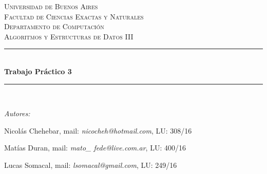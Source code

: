 \documentclass[A4paper,oneside,fleqn,11pt]{article}
\theoremstyle{definition}
\begin{document}

\begin{titlepage}

\center %

\newcommand{\HRule}{\rule{\linewidth}{0.5mm}} %

\textsc{\LARGE Universidad de Buenos Aires}\\[1.5cm] %
\textsc{\Large Facultad de Ciencias Exactas y Naturales}\\[0.5cm] %
\textsc{\large Departamento de Computación}\\[0.5cm] %
\textsc{\large Algoritmos y Estructuras de Datos III}\\[0.5cm] %

\HRule \\[0.8cm]
{ \huge \bfseries Trabajo Práctico 3}\\[0.4cm] %
\HRule \\[1.5cm]

\begin{minipage}{0.8\textwidth}
\center
\Large
\emph{Autores:}


{Nicolás Chehebar, mail: \textit{nicocheh@hotmail.com}, LU: 308/16 

Matías Duran, mail: \textit{mato\_ fede@live.com.ar}, LU: 400/16 

Lucas Somacal, mail: \textit{lsomacal@gmail.com}, LU: 249/16} %
~
\end{minipage}\\[4cm]


\vfill %

\end{titlepage}

\end{document}
